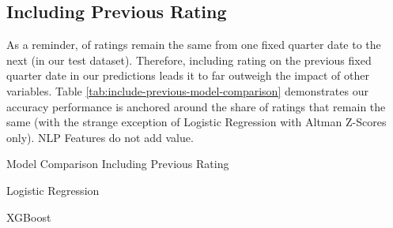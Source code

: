 \documentclass{article}[11pt]
\begin{document}


    \clearpage
    \newpage

    \subsection{Including Previous Rating}

    \label{sec:include-previous-rating}

    As a reminder, \shareNotChanges \space of ratings remain the same from one fixed quarter date to the next (\shareNotChangesTest \space in our test dataset). Therefore, including rating on the previous fixed quarter date in our predictions leads it to far outweigh the impact of other variables. Table \ref{tab:include-previous-model-comparison} demonstrates our accuracy performance is anchored around the share of ratings that remain the same (with the strange exception of Logistic Regression with Altman Z-Scores only). NLP Features do not add value.

    \begin{table}[h!]
        \centering
        \caption{Model Comparison Including Previous Rating}
        \begin{minipage}[c]{0.495\linewidth}
            \centering
            
            \caption*{\footnotesize Logistic Regression} 
        \end{minipage}
        \begin{minipage}[c]{0.495\linewidth}
            \centering
            
            \caption*{\footnotesize XGBoost} 
        \end{minipage}
        \label{tab:include-previous-model-comparison}
    \end{table}
\end{document}
